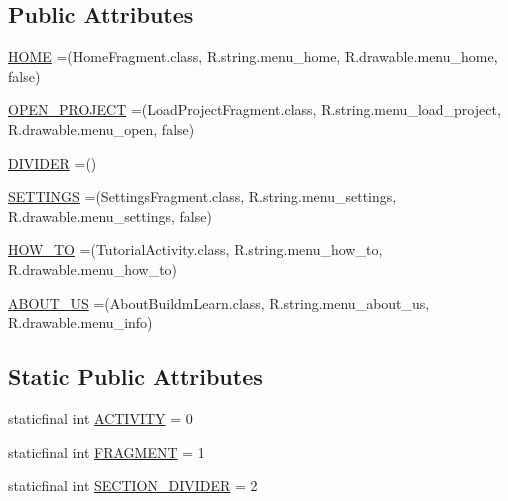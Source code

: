 \subsection*{Public Attributes}
\begin{DoxyCompactItemize}
\item 
\hyperlink{enumorg_1_1buildmlearn_1_1toolkit_1_1model_1_1Section_aa21b990b779598b93484c13cc883b2e9}{H\-O\-M\-E} =(Home\-Fragment.\-class, R.\-string.\-menu\-\_\-home, R.\-drawable.\-menu\-\_\-home, false)
\item 
\hyperlink{enumorg_1_1buildmlearn_1_1toolkit_1_1model_1_1Section_af342562594f60ed736f519aaa1932127}{O\-P\-E\-N\-\_\-\-P\-R\-O\-J\-E\-C\-T} =(Load\-Project\-Fragment.\-class, R.\-string.\-menu\-\_\-load\-\_\-project, R.\-drawable.\-menu\-\_\-open, false)
\item 
\hyperlink{enumorg_1_1buildmlearn_1_1toolkit_1_1model_1_1Section_a99456d62ef2b191fe8c99efcbb6495db}{D\-I\-V\-I\-D\-E\-R} =()
\item 
\hyperlink{enumorg_1_1buildmlearn_1_1toolkit_1_1model_1_1Section_a6829d7052c40f9c876e0886cc093be85}{S\-E\-T\-T\-I\-N\-G\-S} =(Settings\-Fragment.\-class, R.\-string.\-menu\-\_\-settings, R.\-drawable.\-menu\-\_\-settings, false)
\item 
\hyperlink{enumorg_1_1buildmlearn_1_1toolkit_1_1model_1_1Section_a339a902a73ccf5feded7345c716511a9}{H\-O\-W\-\_\-\-T\-O} =(Tutorial\-Activity.\-class, R.\-string.\-menu\-\_\-how\-\_\-to, R.\-drawable.\-menu\-\_\-how\-\_\-to)
\item 
\hyperlink{enumorg_1_1buildmlearn_1_1toolkit_1_1model_1_1Section_abcbac90e6514bf6ed99323773f8fa5a4}{A\-B\-O\-U\-T\-\_\-\-U\-S} =(About\-Buildm\-Learn.\-class, R.\-string.\-menu\-\_\-about\-\_\-us, R.\-drawable.\-menu\-\_\-info)
\end{DoxyCompactItemize}
\subsection*{Static Public Attributes}
\begin{DoxyCompactItemize}
\item 
staticfinal int \hyperlink{enumorg_1_1buildmlearn_1_1toolkit_1_1model_1_1Section_a9afae152c2f7c91883417b9de909da27}{A\-C\-T\-I\-V\-I\-T\-Y} = 0
\item 
staticfinal int \hyperlink{enumorg_1_1buildmlearn_1_1toolkit_1_1model_1_1Section_a536f7f08eb441bb4af16270238999cc4}{F\-R\-A\-G\-M\-E\-N\-T} = 1
\item 
staticfinal int \hyperlink{enumorg_1_1buildmlearn_1_1toolkit_1_1model_1_1Section_acc0a57a45c96711214e40f17b5b3cfe0}{S\-E\-C\-T\-I\-O\-N\-\_\-\-D\-I\-V\-I\-D\-E\-R} = 2
\end{DoxyCompactItemize}


